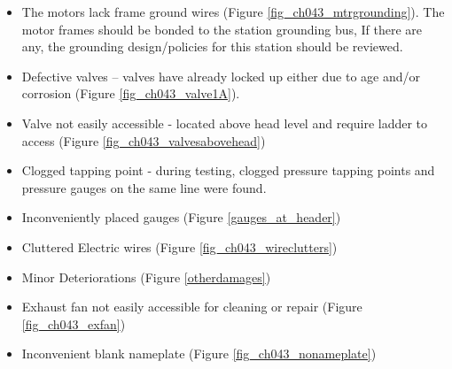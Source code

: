 \begin{itemize}
	\item  The motors lack frame ground wires (Figure \ref{fig_ch043_mtrgrounding}). The motor frames should be bonded to the station grounding bus, If there are any, the grounding design/policies for this station should be reviewed.
	\item Defective valves – valves have already locked up either due to age and/or corrosion (Figure \ref{fig_ch043_valve1A}).
	\item Valve not easily accessible - located above head level and require ladder to access (Figure \ref{fig_ch043_valvesabovehead})
	\item Clogged tapping point -  during testing, clogged pressure tapping points and pressure gauges on the same line were found.
	\item Inconveniently placed gauges (Figure \ref{gauges_at_header})
	\item Cluttered Electric wires (Figure \ref{fig_ch043_wireclutters})
	\item Minor Deteriorations (Figure \ref{otherdamages})
	\item Exhaust fan not easily accessible for cleaning or repair (Figure \ref{fig_ch043_exfan})
	\item Inconvenient blank nameplate (Figure \ref{fig_ch043_nonameplate})
	
\end{itemize}

